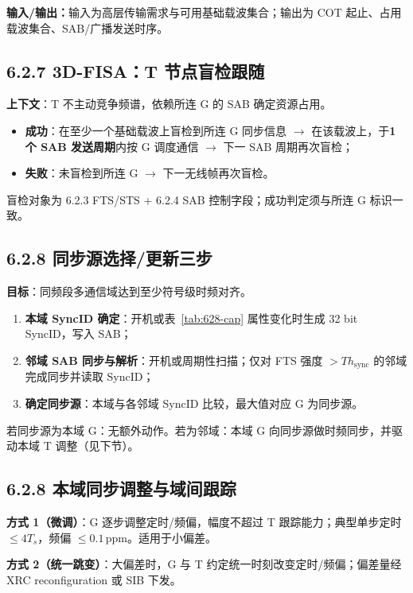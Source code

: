 \documentclass[11pt,a4paper]{ctexart}
\begin{document}
\textbf{输入/输出：}输入为高层传输需求与可用基础载波集合；输出为 COT 起止、占用载波集合、SAB/广播发送时序。

\subsection{6.2.7 3D-FISA：T 节点盲检跟随}

\textbf{上下文}：T 不主动竞争频谱，依赖所连 G 的 SAB 确定资源占用。

\begin{itemize}[nosep]
  \item \textbf{成功}：在至少一个基础载波上盲检到所连 G 同步信息 $\rightarrow$ 在该载波上，于\textbf{1 个 SAB 发送周期}内按 G 调度通信 $\rightarrow$ 下一 SAB 周期再次盲检；
  \item \textbf{失败}：未盲检到所连 G $\rightarrow$ 下一无线帧再次盲检。
\end{itemize}

盲检对象为 6.2.3 FTS/STS + 6.2.4 SAB 控制字段；成功判定须与所连 G 标识一致。

\subsection{6.2.8 同步源选择/更新三步}

\textbf{目标}：同频段多通信域达到至少符号级时频对齐。

\begin{enumerate}[nosep]
  \item \textbf{本域 SyncID 确定}：开机或表~\ref{tab:628-cap} 属性变化时生成 32 bit SyncID，写入 SAB；
  \item \textbf{邻域 SAB 同步与解析}：开机或周期性扫描；仅对 FTS 强度 $>Th_{\mathrm{sync}}$ 的邻域完成同步并读取 SyncID；
  \item \textbf{确定同步源}：本域与各邻域 SyncID 比较，最大值对应 G 为同步源。
\end{enumerate}

若同步源为本域 G：无额外动作。若为邻域：本域 G 向同步源做时频同步，并驱动本域 T 调整（见下节）。

\subsection{6.2.8 本域同步调整与域间跟踪}

\textbf{方式 1（微调）}：G 逐步调整定时/频偏，幅度不超过 T 跟踪能力；典型单步定时 $\le 4T_s$，频偏 $\le 0.1$\,ppm。适用于小偏差。

\textbf{方式 2（统一跳变）}：大偏差时，G 与 T 约定统一时刻改变定时/频偏；偏差量经 XRC reconfiguration 或 SIB 下发。
\end{document}
